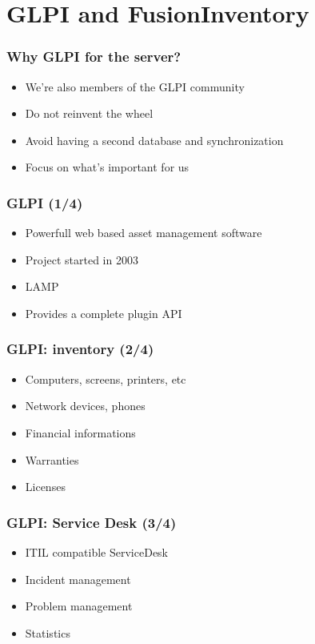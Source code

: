 \documentclass{beamer}
\begin{document}
\section{GLPI and FusionInventory}

\begin{frame}
    \frametitle{Why GLPI for the server?}

    \begin{itemize}
    \item We're also members of the GLPI community
    \item Do not reinvent the wheel
    \item Avoid having a second database and synchronization
    \item Focus on what's important for us
    \end{itemize}
\end{frame}

\begin{frame}
    \frametitle{GLPI (1/4)}

    \begin{itemize}
    \item Powerfull web based asset management software
    \item Project started in 2003
    \item LAMP
    \item Provides a complete plugin API
    \end{itemize}
\end{frame}

\begin{frame}
    \frametitle{GLPI: inventory (2/4)}

    \begin{itemize}
    \item Computers, screens, printers, etc
    \item Network devices, phones
    \item Financial informations
    \item Warranties
    \item Licenses
    \end{itemize}
\end{frame}

\begin{frame}
    \frametitle{GLPI: Service Desk (3/4)}

    \begin{itemize}
    \item ITIL compatible ServiceDesk
    \item Incident management
    \item Problem management
    \item Statistics
    \end{itemize}
\end{frame}
\end{document}
